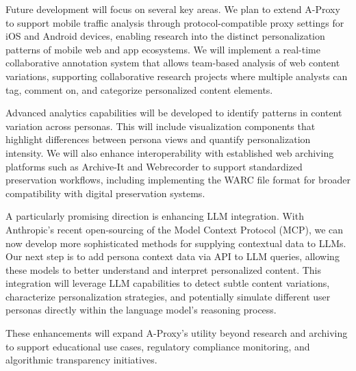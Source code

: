 \documentclass[sigconf]{acmart}
\begin{document}
Future development will focus on several key areas. We plan to extend A-Proxy to support mobile traffic analysis through protocol-compatible proxy settings for iOS and Android devices, enabling research into the distinct personalization patterns of mobile web and app ecosystems. We will implement a real-time collaborative annotation system that allows team-based analysis of web content variations, supporting collaborative research projects where multiple analysts can tag, comment on, and categorize personalized content elements.

Advanced analytics capabilities will be developed to identify patterns in content variation across personas. This will include visualization components that highlight differences between persona views and quantify personalization intensity. We will also enhance interoperability with established web archiving platforms such as Archive-It and Webrecorder to support standardized preservation workflows, including implementing the WARC file format for broader compatibility with digital preservation systems.

A particularly promising direction is enhancing LLM integration. With Anthropic's recent open-sourcing of the Model Context Protocol (MCP), we can now develop more sophisticated methods for supplying contextual data to LLMs. Our next step is to add persona context data via API to LLM queries, allowing these models to better understand and interpret personalized content. This integration will leverage LLM capabilities to detect subtle content variations, characterize personalization strategies, and potentially simulate different user personas directly within the language model's reasoning process.

These enhancements will expand A-Proxy's utility beyond research and archiving to support educational use cases, regulatory compliance monitoring, and algorithmic transparency initiatives.



\end{document}
